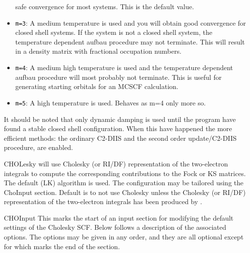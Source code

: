 \begin{keywordlist}
\begin{itemize}
           safe convergence for most systems. This is the default value.
\item \verb+m=3+: A medium temperature is used and you will obtain good
           convergence for closed shell systems. If the system is not
           a closed shell system, the temperature dependent aufbau
           procedure may not terminate. This will result in a density
           matrix with fractional occupation numbers.
\item \verb+m=4+: A medium high temperature is used and the temperature
           dependent aufbau procedure will most probably not terminate.
           This is useful for generating starting orbitals for an MCSCF
           calculation.
\item \verb+m=5+: A high temperature is used. Behaves as m=4 only more so.
\end{itemize}
It should be noted that only dynamic damping is used until the
program have found a stable closed shell configuration. When
this have happened the more efficient methods: the ordinary
C2-DIIS and the second order update/C2-DIIS procedure, are
enabled.
\item[CHOLesky]
 will use Cholesky (or RI/DF) representation of the two-electron integrals to compute
the corresponding contributions to the Fock or KS matrices. The default (LK)
algorithm is used. The configuration may be tailored using the ChoInput section.
Default is to not use Cholesky unless the Cholesky (or RI/DF) representation of the two-electron
integrals has been produced by .
\item[CHOInput]
This marks the start of an input section for modifying
the default settings of the Cholesky SCF.
Below follows a description of the associated options.
The options may be given in any order,
and they are all optional except for
 which marks the end of the  section.


\end{keywordlist}
